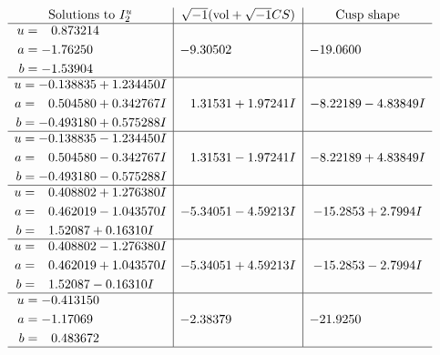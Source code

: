 \documentclass[1p]{elsarticle_modified}
\theoremstyle{definition}
\newcommand{\I}{\sqrt{-1}}
\begin{document}
$$\begin{array}{c|c|c}  
\text{Solutions to }I^u_{2}& \I (\text{vol} + \sqrt{-1}CS) & \text{Cusp shape}\\
 \hline 
\begin{aligned}
u &= \phantom{-}0.873214\phantom{ +0.000000I} \\
a &= -1.76250\phantom{ +0.000000I} \\
b &= -1.53904\phantom{ +0.000000I}\end{aligned}
 & -9.30502\phantom{ +0.000000I} & -19.0600\phantom{ +0.000000I} \\ \hline\begin{aligned}
u &= -0.138835 + 1.234450 I \\
a &= \phantom{-}0.504580 + 0.342767 I \\
b &= -0.493180 + 0.575288 I\end{aligned}
 & \phantom{-}1.31531 + 1.97241 I & -8.22189 - 4.83849 I \\ \hline\begin{aligned}
u &= -0.138835 - 1.234450 I \\
a &= \phantom{-}0.504580 - 0.342767 I \\
b &= -0.493180 - 0.575288 I\end{aligned}
 & \phantom{-}1.31531 - 1.97241 I & -8.22189 + 4.83849 I \\ \hline\begin{aligned}
u &= \phantom{-}0.408802 + 1.276380 I \\
a &= \phantom{-}0.462019 - 1.043570 I \\
b &= \phantom{-}1.52087 + 0.16310 I\end{aligned}
 & -5.34051 - 4.59213 I & -15.2853 + 2.7994 I \\ \hline\begin{aligned}
u &= \phantom{-}0.408802 - 1.276380 I \\
a &= \phantom{-}0.462019 + 1.043570 I \\
b &= \phantom{-}1.52087 - 0.16310 I\end{aligned}
 & -5.34051 + 4.59213 I & -15.2853 - 2.7994 I \\ \hline\begin{aligned}
u &= -0.413150\phantom{ +0.000000I} \\
a &= -1.17069\phantom{ +0.000000I} \\
b &= \phantom{-}0.483672\phantom{ +0.000000I}\end{aligned}
 & -2.38379\phantom{ +0.000000I} & -21.9250\phantom{ +0.000000I}\\
 \hline 
 \end{array}$$\newpage
\end{document}
